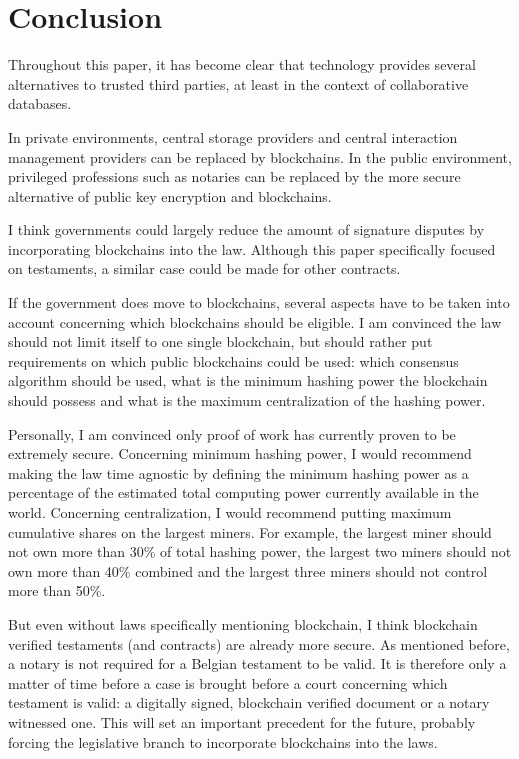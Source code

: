\chapter{Conclusion}

Throughout this paper, it has become clear that technology provides several alternatives to trusted third parties, at least in the context of collaborative databases. 

In  private environments, central storage providers and central interaction management providers can be replaced by blockchains. In the public environment, privileged professions such as notaries can be replaced by the more secure alternative of public key encryption and blockchains.

I think governments could largely reduce the amount of signature disputes by incorporating blockchains into the law. Although this paper specifically focused on testaments, a similar case could be made for other contracts. 

If the government does move to blockchains, several aspects have to be taken into account concerning which blockchains should be eligible. I am convinced the law should not limit itself to one single blockchain, but should rather put requirements on which public blockchains could be used: which consensus algorithm should be used, what is the minimum hashing power the blockchain should possess and what is the maximum centralization of the hashing power. 

Personally, I am convinced only proof of work has currently proven to be extremely secure. Concerning minimum hashing power, I would recommend making the law time agnostic by defining the minimum hashing power as a percentage of the estimated total computing power currently available in the world. Concerning centralization, I would recommend putting maximum cumulative shares on the largest miners. For example, the largest miner should not own more than 30\% of total hashing power, the largest two miners should not own more than 40\% combined and the largest three miners should not control more than 50\%. 

But even without laws specifically mentioning blockchain, I think blockchain verified testaments (and contracts) are already more secure. As mentioned before, a notary is not required for a Belgian testament to be valid. It is therefore only a matter of time before a case is brought before a court concerning which testament is valid: a digitally signed, blockchain verified document or a notary witnessed one. This will set an important precedent for the future, probably forcing the legislative branch to incorporate blockchains into the laws.

